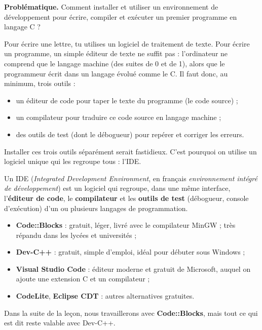 \documentclass[11pt]{article}
\newcommand{\cle}[1]{{\popxbold\color{popdark}#1}}
\newcounter{popsec}
\newcounter{popsub}
\newcommand{\courssub}[1]{%
  \stepcounter{popsub}%
  \par\vspace{9pt}\noindent{\popxbold\fontsize{11.5}{13}\selectfont\color{popink}{\color{poporange}\thepopsec.\thepopsub}\hspace{6pt}#1}\par\nopagebreak\vspace{4pt}
}
\begin{document}
\textbf{Problématique.} Comment installer et utiliser un environnement de développement pour écrire, compiler et exécuter un premier programme en langage C ?

\courssub{Qu'est-ce qu'un IDE ?}

Pour écrire une lettre, tu utilises un logiciel de traitement de texte. Pour écrire un programme, un simple éditeur de texte ne suffit pas : l'ordinateur ne comprend que le \cle{langage machine} (des suites de 0 et de 1), alors que le programmeur écrit dans un langage évolué comme le C. Il faut donc, au minimum, trois outils :

\begin{itemize}
\item un \cle{éditeur de code} pour taper le texte du programme (le \cle{code source}) ;
\item un \cle{compilateur} pour traduire ce code source en langage machine ;
\item des outils de test (dont le \cle{débogueur}) pour repérer et corriger les erreurs.
\end{itemize}

Installer ces trois outils séparément serait fastidieux. C'est pourquoi on utilise un logiciel unique qui les regroupe tous : l'IDE.

\begin{definition}[IDE]
Un \cle{IDE} (\emph{Integrated Development Environment}, en français \emph{environnement intégré de développement}) est un logiciel qui regroupe, dans une même interface, l'\textbf{éditeur de code}, le \textbf{compilateur} et les \textbf{outils de test} (débogueur, console d'exécution) d'un ou plusieurs langages de programmation.
\end{definition}

\begin{exemplebox}
\begin{itemize}
\item \textbf{Code::Blocks} : gratuit, léger, livré avec le compilateur MinGW ; très répandu dans les lycées et universités ;
\item \textbf{Dev-C++} : gratuit, simple d'emploi, idéal pour débuter sous Windows ;
\item \textbf{Visual Studio Code} : éditeur moderne et gratuit de Microsoft, auquel on ajoute une extension C et un compilateur ;
\item \textbf{CodeLite}, \textbf{Eclipse CDT} : autres alternatives gratuites.
\end{itemize}
Dans la suite de la leçon, nous travaillerons avec \textbf{Code::Blocks}, mais tout ce qui est dit reste valable avec Dev-C++.
\end{exemplebox}
\end{document}

